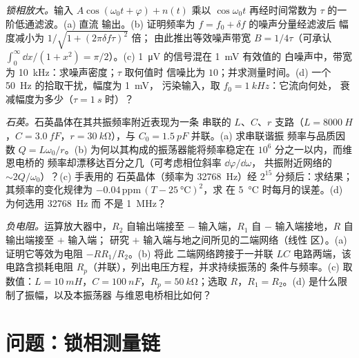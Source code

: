 \begin{exercise}[$\star\star\star$]\label{exo:b2:feedback-oscillators:10}
\emph{锁相放大。}输入 $A\cos(\omega_0t + \varphi) + n(t)$ 乘以 $\cos\omega_0t$
再经时间常数为 $\tau$ 的一阶低通滤波。(a) 直流
输出。(b) 证明频率为 $f = f_0 + \delta f$ 的噪声分量经滤波后
幅度减小为 $1/\sqrt{1 + (2\pi\delta f\tau)^2}$ 倍；
由此推出等效噪声带宽 $B = 1/4\tau$（可承认 $\int_0^\infty
\dd x/(1 + x^2) = \pi/2$）。(c) \qty{1}{\micro V} 的信号混在 \qty{1}{mV} 有效值的
白噪声中，带宽为 \qty{10}{kHz}：求噪声密度；$\tau$ 取何值时
信噪比为 $10$；并求测量时间。(d) 一个 \qty{50}{Hz} 的拾取干扰，幅度为 \qty{1}{mV}，
污染输入，取 $f_0 = \qty{1}{kHz}$：它流向何处，
衰减幅度为多少（$\tau = \qty{1}{s}$ 时）？
\end{exercise}

\begin{exercise}[$\star\star\star$]\label{exo:b2:feedback-oscillators:11}
\emph{石英。}石英晶体在其共振频率附近表现为一条
串联的 $L$、$C$、$r$ 支路（$L = \qty{8000}{H}$，$C = \qty{3.0}{fF}$，$r =
\qty{30}{k\ohm}$），与 $C_0 = \qty{1.5}{pF}$ 并联。(a) 求串联谐振
频率与品质因数 $Q = L\omega_0/r$。(b) 为何以其构成的振荡器能将频率稳定在
$10^6$ 分之一以内，而维恩电桥的
频率却漂移达百分之几（可考虑相位斜率 $\dd\varphi/\dd\omega$，
共振附近网络的 $\sim 2Q/\omega_0$）？(c) 手表用的
石英晶体（频率为 \qty{32768}{Hz}）经 $2^{15}$ 分频后：求结果；
其频率的变化规律为 $-0.04\,\text{ppm}\,(T - \qty{25}{\degreeCelsius})^2$，求
在 \qty{5}{\degreeCelsius} 时每月的误差。(d) 为何选用 \qty{32768}{Hz} 而
不是 \qty{1}{MHz}？
\end{exercise}

\begin{exercise}[$\star\star\star$]\label{exo:b2:feedback-oscillators:12}
\emph{负电阻。}运算放大器中，$R_2$ 自输出端接至 $-$
输入端，$R_1$ 自 $-$ 输入端接地，$R$ 自输出端接至 $+$ 输入端；
研究 $+$ 输入端与地之间所见的二端网络（线性
区）。(a) 证明它等效为电阻 $-RR_1/R_2$。(b) 将此
二端网络跨接于一并联 $LC$ 电路两端，该电路含损耗电阻
$R_p$（并联），列出电压方程，并求持续振荡的
条件与频率。(c) 取数值：$L
= \qty{10}{mH}$，$C = \qty{100}{nF}$，$R_p = \qty{50}{k\ohm}$；选取 $R$，$R_1 =
R_2$。(d) 是什么限制了振幅，以及本振荡器
与维恩电桥相比如何？
\end{exercise}

\section{问题：锁相测量链}

